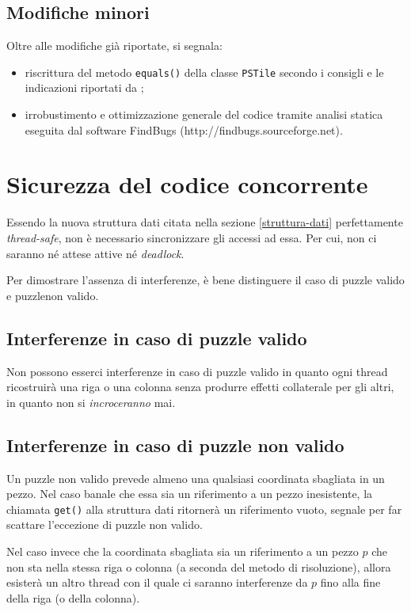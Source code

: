 \documentclass[a4paper, 12pt]{article}
\begin{document}
\subsection{Modifiche minori}
Oltre alle modifiche già riportate, si segnala:
\begin{itemize}
\item riscrittura del metodo \verb|equals()| della classe \verb|PSTile|
secondo i consigli e le indicazioni riportati da \cite{bloch2008effective};
\item irrobustimento e ottimizzazione generale del codice tramite analisi
statica eseguita dal software FindBugs (http://findbugs.sourceforge.net).
\end{itemize}

\section{Sicurezza del codice concorrente}
Essendo la nuova struttura dati citata nella sezione \ref{struttura-dati} perfettamente \emph{thread-safe}, non è necessario sincronizzare gli accessi ad
essa. Per cui, non ci saranno né attese attive né \emph{deadlock}.

Per dimostrare l'assenza di interferenze, è bene distinguere il caso di puzzle
valido e puzzlenon valido.

\subsection{Interferenze in caso di puzzle valido}
Non possono esserci interferenze in caso di puzzle valido in quanto ogni thread
ricostruirà una riga o una colonna senza produrre effetti collaterale per gli
altri, in quanto non si \emph{incroceranno} mai.

\subsection{Interferenze in caso di puzzle non valido}
Un puzzle non valido prevede almeno una qualsiasi coordinata sbagliata in un
pezzo. Nel caso banale che essa sia un riferimento a un pezzo inesistente, la
chiamata \verb|get()| alla struttura dati ritornerà un riferimento vuoto,
segnale per far scattare l'eccezione di puzzle non valido.

Nel caso invece che la coordinata sbagliata sia un riferimento a un pezzo $p$
che non sta nella stessa riga o colonna (a seconda del metodo di risoluzione),
allora esisterà un altro thread con il quale ci saranno interferenze da $p$ fino
alla fine della riga (o della colonna).
\end{document}
